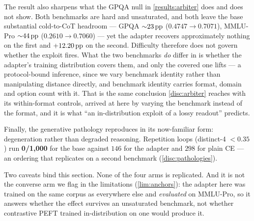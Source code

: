 The result also sharpens what the GPQA null in \cref{results:arbiter} does and does
not show. Both benchmarks are hard and unsaturated, and both leave the base
substantial cold-to-CoT headroom --- GPQA ${\sim}23\,\mathrm{pp}$ ($0.4747 \rightarrow
0.7071$), MMLU-Pro ${\sim}44\,\mathrm{pp}$ ($0.2610 \rightarrow 0.7060$) --- yet the adapter
recovers approximately nothing on the first and $+12.20\,\mathrm{pp}$ on the second. Difficulty
therefore does not govern whether the exploit fires. What the two benchmarks
\emph{do} differ in is whether the adapter's training distribution covers them, and
only the covered one lifts --- a protocol-bound inference, since we vary benchmark
identity rather than manipulating distance directly, and benchmark identity carries
format, domain and option count with it. That is the same conclusion \cref{disc:arbiter}
reaches with its within-format controls, arrived at here by varying the benchmark
instead of the format, and it is what ``an in-distribution exploit of a lossy
readout'' predicts.

Finally, the generative pathology reproduces in its now-familiar form: degeneration
rather than degraded reasoning. Repetition loops (distinct-4 $< 0.35$) run
\textbf{0/1{,}000} for the base against $146$ for the adapter and $298$ for plain CE ---
an ordering that replicates on a second benchmark (\cref{disc:pathologies}).

Two caveats bind this section. None of the four arms is replicated. And it is not the converse arm
we flag in the limitations (\cref{lim:anchors}): the adapter here was trained on the same corpus as everywhere
else and \emph{evaluated} on MMLU-Pro, so it answers whether the effect survives an
unsaturated benchmark, not whether contrastive PEFT trained in-distribution on one
would produce it.
